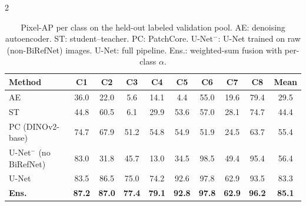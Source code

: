 \documentclass[11pt]{article}
\begin{document}
\begin{multicols}{2}
        \begin{table}[tb]
            \centering
            \footnotesize
            \setlength{\tabcolsep}{4pt}
            \caption{Pixel-AP per class on the held-out labeled validation pool.
            AE: denoising autoencoder. ST: student--teacher.
            PC: PatchCore. U-Net$^-$: U-Net trained on raw
            (non-BiRefNet) images. U-Net: full pipeline. Ens.: weighted-sum
            fusion with per-class $\alpha$. }
            \label{tab:per-class-ap}
            \begin{tabular}{lccccccccc}
                Method & C1 & C2 & C3 & C4 & C5 & C6 & C7 & C8 & Mean \\
                \midrule
                AE & 36.0 & 22.0 & 5.6 & 14.1 & 4.4 & 55.0 & 19.6 & 79.4 & 29.5 \\
                ST & 44.8 & 60.5 & 6.1 & 29.9 & 53.6 & 57.0 & 28.1 & 74.7 & 44.4 \\
                PC (DINOv2-base) & 74.7 & 67.9 & 51.2 & 54.8 & 54.9 & 51.9 & 24.5 & 63.7 & 55.4 \\
                U-Net$^{-}$ (no BiRefNet) & 83.0 & 31.8 & 45.7 & 13.0 & 34.5 & 98.5 & 49.4 & 95.4 & 56.4 \\
                U-Net & 83.5 & 86.5 & 75.0 & 74.2 & 92.6 & 97.8 & 62.9 & 93.5 & 83.3 \\
                \midrule
                \textbf{Ens.} & \textbf{87.2} & \textbf{87.0} & \textbf{77.4} & \textbf{79.1} & \textbf{92.8} & \textbf{97.8} & \textbf{62.9} & \textbf{96.2} & \textbf{85.1} \\
                \bottomrule
            \end{tabular}
        \end{table}

        

\end{multicols}
\end{document}
